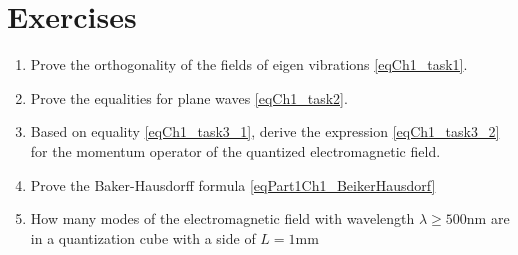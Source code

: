\section{Exercises}
\begin{enumerate}
\item Prove the orthogonality of the fields of eigen vibrations
  \eqref{eqCh1_task1}.  
\item Prove the equalities for plane waves \eqref{eqCh1_task2}.
\item Based on equality \eqref{eqCh1_task3_1}, derive the expression
  \eqref{eqCh1_task3_2} for the momentum operator of the quantized
  electromagnetic field. 
\item Prove the Baker-Hausdorff formula \eqref{eqPart1Ch1_BeikerHausdorf}
\item How many modes \label{qQuantelNumberMods} of the electromagnetic field with
  wavelength $\lambda \ge 500 \mbox{nm}$ are in a quantization cube with a side of $L=1 \mbox{mm}$
  \cite{courseIntroQuantumOpticsCoursera} 
\end{enumerate}